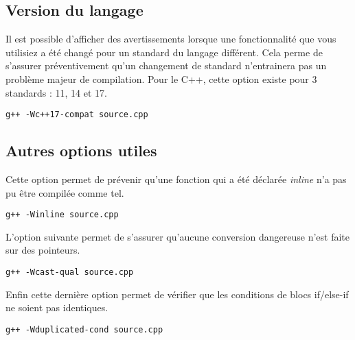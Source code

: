 \documentclass[a4paper, 12pt]{article}
\begin{document}
    \subsection{Version du langage}
        Il est possible d'afficher des avertissements lorsque une fonctionnalité que vous utilisiez a été changé pour un standard du langage différent.
        Cela perme de s'assurer préventivement qu'un changement de standard n'entrainera pas un problème majeur de compilation. Pour le C++, cette option existe pour 3 standards : 11, 14 et 17.
        \begin{mdframed}[backgroundcolor=light-gray, roundcorner=20pt,
            innerleftmargin=20, innertopmargin=1, innerbottommargin=1, 
            outerlinewidth=1, linecolor=darkgray]
            \begin{lstlisting}
g++ -Wc++17-compat source.cpp
            \end{lstlisting}
        \end{mdframed}
   
    \subsection{Autres options utiles}
        Cette option permet de prévenir qu'une fonction qui a été déclarée \emph{inline} n'a pas pu être compilée comme tel.
        \begin{mdframed}[backgroundcolor=light-gray, roundcorner=20pt,
            innerleftmargin=20, innertopmargin=1, innerbottommargin=1, 
            outerlinewidth=1, linecolor=darkgray]
            \begin{lstlisting}
g++ -Winline source.cpp
            \end{lstlisting}
        \end{mdframed}
        L'option suivante permet de s'assurer qu'aucune conversion dangereuse n'est faite sur des pointeurs.
        \begin{mdframed}[backgroundcolor=light-gray, roundcorner=20pt,
            innerleftmargin=20, innertopmargin=1, innerbottommargin=1, 
            outerlinewidth=1, linecolor=darkgray]
            \begin{lstlisting}
g++ -Wcast-qual source.cpp
            \end{lstlisting}
        \end{mdframed}
        Enfin cette dernière option permet de vérifier que les conditions de blocs if/else-if ne soient pas identiques.
        \begin{mdframed}[backgroundcolor=light-gray, roundcorner=20pt,
            innerleftmargin=20, innertopmargin=1, innerbottommargin=1, 
            outerlinewidth=1, linecolor=darkgray]
            \begin{lstlisting}
g++ -Wduplicated-cond source.cpp
            \end{lstlisting}
        \end{mdframed}
\end{document}
